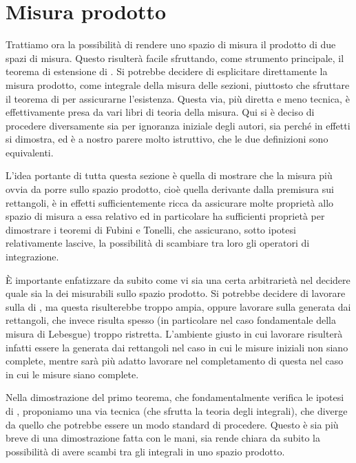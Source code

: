 \section{Misura prodotto}
Trattiamo ora la possibilità di rendere uno spazio di misura il prodotto di due spazi di misura. 
Questo risulterà facile sfruttando, come strumento principale, il teorema di estensione di \carat{}. 
Si potrebbe decidere di esplicitare direttamente la misura prodotto, come integrale della misura delle sezioni, piuttosto che sfruttare il teorema di \carat{} per assicurarne l'esistenza. 
Questa via, più diretta e meno tecnica, è effettivamente presa da vari libri di teoria della misura. Qui si è deciso di procedere diversamente sia per ignoranza iniziale degli autori, sia perché in effetti si dimostra, ed è a nostro parere molto istruttivo, che le due definizioni sono equivalenti.

L'idea portante di tutta questa sezione è quella di mostrare che la misura più ovvia da porre sullo spazio prodotto, cioè quella derivante dalla premisura sui rettangoli, è in effetti sufficientemente  ricca da assicurare molte proprietà allo spazio di misura a essa relativo ed in particolare ha sufficienti proprietà per dimostrare i teoremi di Fubini e Tonelli, che assicurano, sotto ipotesi relativamente lascive, la possibilità di scambiare tra loro gli operatori di integrazione.

È importante enfatizzare da subito come vi sia una certa arbitrarietà nel decidere quale sia la \sigalg{} dei misurabili sullo spazio prodotto. Si potrebbe decidere di lavorare sulla \sigalg{} di \carat{}, ma questa risulterebbe troppo ampia, oppure lavorare sulla \sigalg{} generata dai rettangoli, che invece risulta spesso (in particolare nel caso fondamentale della misura di Lebesgue) troppo ristretta.
L'ambiente giusto in cui lavorare risulterà infatti essere la \sigalg{} generata dai rettangoli nel caso in cui le misure iniziali non siano complete, mentre sarà più adatto lavorare nel completamento di questa \sigalg{} nel caso in cui le misure siano complete.



Nella dimostrazione del primo teorema, che fondamentalmente verifica le ipotesi di \carat{}, proponiamo una via tecnica (che sfrutta la teoria degli integrali), che diverge da quello che potrebbe essere un modo standard di procedere. Questo è sia più breve di una dimostrazione fatta con le mani, sia rende chiara da subito la possibilità di avere scambi tra gli integrali in uno spazio prodotto. 

